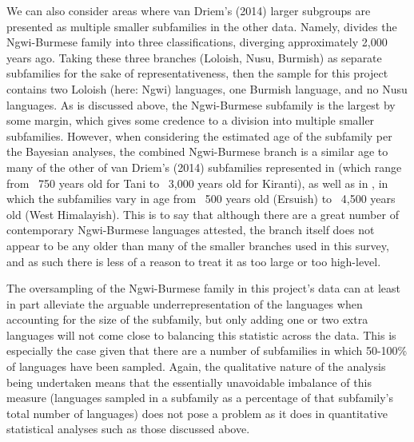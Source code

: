 We can also consider areas where van Driem's (2014) larger subgroups are presented as multiple smaller subfamilies in the other data. Namely,  divides the Ngwi-Burmese family into three classifications, diverging approximately 2,000 years ago. Taking these three branches (Loloish, Nusu, Burmish) as separate subfamilies for the sake of representativeness, then the sample for this project contains two Loloish (here: Ngwi) languages, one Burmish language, and no Nusu languages. As is discussed above, the Ngwi-Burmese subfamily is the largest by some margin, which gives some credence to a division into multiple smaller subfamilies. However, when considering the estimated age of the subfamily per the Bayesian analyses, the combined Ngwi-Burmese branch is a similar age to many of the other of van Driem's (2014) subfamilies represented in  (which range from ~750 years old for Tani to ~3,000 years old for Kiranti), as well as in , in which the subfamilies vary in age from ~500 years old (Ersuish) to ~4,500 years old (West Himalayish). This is to say that although there are a great number of contemporary Ngwi-Burmese languages attested, the branch itself does not appear to be any older than many of the smaller branches used in this survey, and as such there is less of a reason to treat it as too large or too high-level.

The oversampling of the Ngwi-Burmese family in this project's data can at least in part alleviate the arguable underrepresentation of the languages when accounting for the size of the subfamily, but only adding one or two extra languages will not come close to balancing this statistic across the data. This is especially the case given that there are a number of subfamilies in which 50-100\% of languages have been sampled. Again, the qualitative nature of the analysis being undertaken means that the essentially unavoidable imbalance of this measure (languages sampled in a subfamily as a percentage of that subfamily's total number of languages) does not pose a problem as it does in quantitative statistical analyses such as those discussed above.

